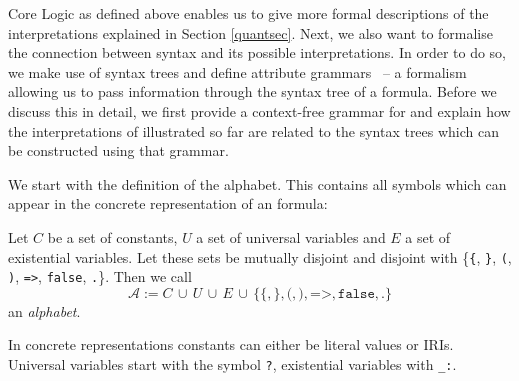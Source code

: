 \nthree Core Logic as defined above enables us to give more formal descriptions of the \nthree interpretations explained in Section \ref{quantsec}.
Next, we also want to formalise the connection between \nthree syntax and its possible interpretations. In order to do so, we make use of syntax trees and define attribute 
grammars~\cite{attributegrammar,ag2} -- a formalism allowing us to pass information through the syntax tree of a formula.
Before we discuss this in detail, we first provide a context-free grammar for \nthree and explain how 
the interpretations of \nthree illustrated so far are related to the syntax trees which can be constructed using that grammar.

% 

We start with the definition of the
alphabet. This contains all symbols which can appear in the concrete representation of an \nthree formula:
\begin{definition} \label{alphabet}
Let $C$ be a set of constants, $U$ a set of universal variables and $E$ a set of existential variables. Let these sets be mutually disjoint and disjoint 
with \{\texttt{\{}, \texttt{\}}, \texttt{(}, \texttt{)}, \texttt{=>}, \texttt{false}, \texttt{.}\}.
Then we call
\[\mathcal{A}:=C \,\cup\, U \,\cup\, E \,\cup\, \{\texttt{\{}, \texttt{\}}, \texttt{(}, \texttt{)}, \texttt{=>}, \texttt{false}, \texttt{.}\}\] an \emph{\nthree alphabet}. 
\end{definition}
%
In concrete representations constants can either be literal values or IRIs.
Universal variables start with the symbol \texttt{?}, existential variables with \texttt{\_:}. %

